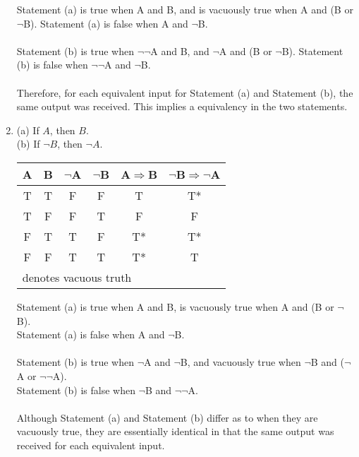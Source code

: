 \documentclass{article}
\begin{document}
\begin{enumerate}[label=(4.\arabic*),start=1]
        Statement (a) is true when A and B, and is vacuously true when A and (B or $\neg$B). Statement (a) is false when A and $\neg$B. \\
        \\
        Statement (b) is true when $\neg$$\neg$A and B, and $\neg$A and (B or $\neg$B). Statement (b) is false when $\neg$$\neg$A and $\neg$B. \\
        \\
        Therefore, for each equivalent input for Statement (a) and Statement (b), the same output was received. This implies a equivalency in the two statements.
    \item (a) If $A$, then $B$. \\
          (b) If $\neg$$B$, then $\neg$$A$. \\
          \begin{center}
            \begin{tabular}{c|c|c|c||c||c}
                \textbf{A} & \textbf{B} & \textbf{$\neg$A} & \textbf{$\neg$B} & \textbf{A$\Rightarrow$B} & \textbf{$\neg$B$\Rightarrow$$\neg$A} \\\hline
                T & T & F & F & T & \hspace{2mm}T*              \\\hline
                T & F & F & T & F & F                           \\\hline
                F & T & T & F & \hspace{2mm}T* & \hspace{2mm}T* \\\hline
                F & F & T & T & \hspace{2mm}T* & T              \\\hline
                \multicolumn{6}{l}{\footnotesize * denotes vacuous truth}
            \end{tabular}
        \end{center}
        Statement (a) is true when A and B, is vacuously true when A and (B or $\neg$B).\\
        Statement (a) is false when A and $\neg$B.\\
        \\
        Statement (b) is true when $\neg$A and $\neg$B, and vacuously true when $\neg$B and ($\neg$A or $\neg$$\neg$A). \\
        Statement (b) is false when $\neg$B and $\neg$$\neg$A.\\
        \\
        Although Statement (a) and Statement (b) differ as to when they are vacuously true, they are essentially identical in that the same output was received for each equivalent input.
\end{enumerate}
\end{document}
